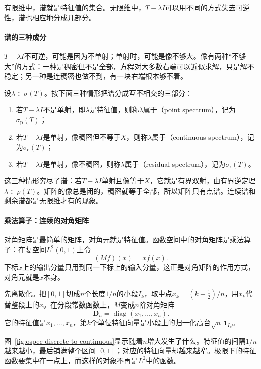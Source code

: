 有限维中，谱就是特征值的集合。无限维中，$T-\lambda I$可以用不同的方式失去可逆性，谱也相应地分成几部分。

\paragraph{谱的三种成分}
$T-\lambda I$不可逆，可能是因为不单射；单射时，可能是像不够大。像有两种“不够大”的方式：一种是稠密但不是全部，方程对大多数右端可以近似求解，只是解不稳定；另一种是连稠密也做不到，有一块右端根本够不着。

\begin{definition}[点谱、连续谱与剩余谱]
\label{def:ospec-spectrum-parts}
设$\lambda\in\sigma(T)$。按下面三种情形把谱分成互不相交的三部分：
\begin{enumerate}
\item 若$T-\lambda I$不是单射，即$\lambda$是特征值，则称$\lambda$属于（point spectrum），记为$\sigma_{\mathrm p}(T)$；
\item 若$T-\lambda I$是单射，像稠密但不等于$X$，则称$\lambda$属于（continuous spectrum），记为$\sigma_{\mathrm c}(T)$；
\item 若$T-\lambda I$是单射，像不稠密，则称$\lambda$属于（residual spectrum），记为$\sigma_{\mathrm r}(T)$。
\end{enumerate}
\end{definition}

这三种情形穷尽了谱：若$T-\lambda I$单射且像等于$X$，它就是有界双射，由有界逆定理$\lambda\in\rho(T)$。矩阵的像总是闭的，稠密就等于全部，所以矩阵只有点谱。连续谱和剩余谱都是无限维才有的现象。

\paragraph{乘法算子：连续的对角矩阵}
对角矩阵是最简单的矩阵，对角元就是特征值。函数空间中的对角矩阵是乘法算子：在复空间$L^2(0,1)$上令
\[
(Mf)(x)=xf(x).
\]
下标$x$上的输出分量只用到同一下标上的输入分量，这正是对角矩阵的作用方式，对角元就是$x$本身。

先离散化。把$[0,1]$切成$n$个长度$1/n$的小段$I_k$，取中点$x_k=(k-\frac12)/n$，用$x_k$代替整段上的$x$。在分段常数函数上，$M$变成$n$阶对角矩阵
\[
\bm D_n=\operatorname{diag}(x_1,\ldots,x_n).
\]
它的特征值是$x_1,\ldots,x_n$，第$k$个单位特征向量是小段上的归一化高台$\sqrt n\,\mathbf 1_{I_k}$。

图~\ref{fig:ospec-discrete-to-continuous}显示随着$n$增大发生了什么。特征值的间隔$1/n$越来越小，最后铺满整个区间$[0,1]$；对应的特征向量却越来越窄。极限下的特征函数要集中在一点上，而这样的对象不再是$L^2$中的函数。

